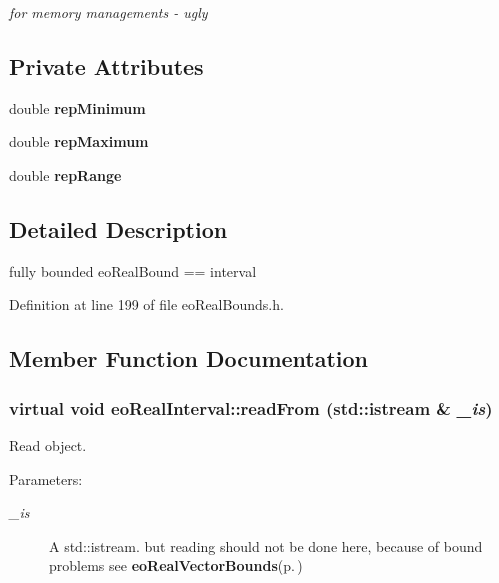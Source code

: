 \begin{CompactItemize}
\begin{CompactList}\small\item\em for memory managements - ugly \item\end{CompactList}\end{CompactItemize}
\subsection*{Private Attributes}
\begin{CompactItemize}
\item 
double {\bf rep\-Minimum}\label{classeo_real_interval_r0}

\item 
double {\bf rep\-Maximum}\label{classeo_real_interval_r1}

\item 
double {\bf rep\-Range}\label{classeo_real_interval_r2}

\end{CompactItemize}


\subsection{Detailed Description}
fully bounded eo\-Real\-Bound == interval 



Definition at line 199 of file eo\-Real\-Bounds.h.

\subsection{Member Function Documentation}
\subsubsection{\setlength{\rightskip}{0pt plus 5cm}virtual void eo\-Real\-Interval::read\-From (std::istream \& {\em \_\-is})\hspace{0.3cm}{\tt  [inline, virtual]}}\label{classeo_real_interval_a13}


Read object. 

\begin{Desc}
\item[Parameters:]
\begin{description}
\item[{\em \_\-is}]A std::istream. but reading should not be done here, because of bound problems see {\bf eo\-Real\-Vector\-Bounds}{\rm (p.\,\pageref{classeo_real_vector_bounds})} \end{description}
\end{Desc}


